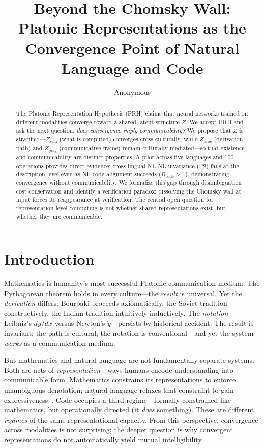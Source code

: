 \documentclass[11pt]{article}
\title{Beyond the Chomsky Wall: Platonic Representations as the\\Convergence Point of Natural Language and Code}
\author{Anonymous}
\date{}
\theoremstyle{definition}
\newcommand{\Zsem}{Z_{\text{sem}}}
\newcommand{\Zproc}{Z_{\text{proc}}}
\newcommand{\Zprag}{Z_{\text{prag}}}
\begin{document}
\maketitle

\begin{abstract}
The Platonic Representation Hypothesis (PRH) claims that neural networks trained on different modalities converge toward a shared latent structure $Z$. We accept PRH and ask the next question: \emph{does convergence imply communicability?} We propose that $Z$ is stratified---$\Zsem$ (what is computed) converges cross-culturally, while $\Zproc$ (derivation path) and $\Zprag$ (communicative frame) remain culturally mediated---so that existence and communicability are distinct properties. A pilot across five languages and 100 operations provides direct evidence: cross-lingual NL-NL invariance (P2) fails at the description level even as NL-code alignment succeeds ($R_{\text{code}} > 1$), demonstrating convergence without communicability. We formalize this gap through disambiguation cost conservation and identify a verification paradox: dissolving the Chomsky wall at input forces its reappearance at verification. The central open question for representation-level computing is not whether shared representations exist, but whether they are communicable.
\end{abstract}


\section{Introduction}

Mathematics is humanity's most successful Platonic communication medium. The Pythagorean theorem holds in every culture---the \emph{result} is universal. Yet the \emph{derivation} differs: Bourbaki proceeds axiomatically, the Soviet tradition constructively, the Indian tradition intuitively-inductively. The \emph{notation}---Leibniz's $dy/dx$ versus Newton's $\dot{y}$---persists by historical accident. The result is invariant; the path is cultural; the notation is conventional---and yet the system \emph{works} as a communication medium.

But mathematics and natural language are not fundamentally separate systems. Both are acts of \emph{representation}---ways humans encode understanding into communicable form. Mathematics constrains its representations to enforce unambiguous denotation; natural language relaxes that constraint to gain expressiveness~\cite{piantadosi2012ambiguity}. Code occupies a third regime---formally constrained like mathematics, but operationally directed (it \emph{does} something). These are different \emph{regimes} of the same representational capacity. From this perspective, convergence across modalities is not surprising; the deeper question is why convergent representations do not automatically yield mutual intelligibility.
\end{document}

